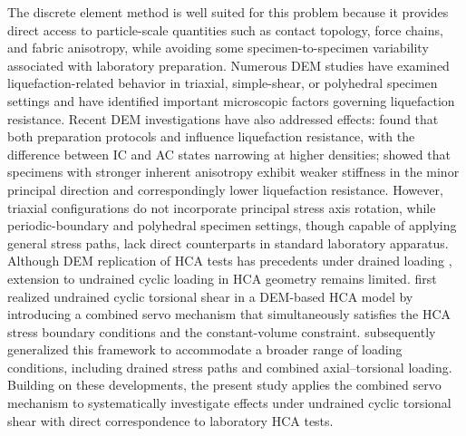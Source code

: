 The discrete element method \citep[DEM;][]{Cundall1979} is well suited for this problem because it provides direct access to particle-scale quantities such as contact topology, force chains, and fabric anisotropy, while avoiding some specimen-to-specimen variability associated with laboratory preparation. Numerous DEM studies have examined liquefaction-related behavior in triaxial, simple-shear, or polyhedral specimen settings \citep[e.g.,][]{Huang2018,Yang2021,Jiang2021,Morimoto2021,WuYang2022,Xie2023,YangHuang2023,Zhang2023} and have identified important microscopic factors governing liquefaction resistance. Recent DEM investigations have also addressed \Kzero{} effects: \citet{YangTaiebat2024} found that both preparation protocols and \Kzero{} influence liquefaction resistance, with the difference between IC and AC states narrowing at higher densities; \citet{Otsubo2022} showed that specimens with stronger inherent anisotropy exhibit weaker stiffness in the minor principal direction and correspondingly lower liquefaction resistance. However, triaxial configurations do not incorporate principal stress axis rotation, while periodic-boundary and polyhedral specimen settings, though capable of applying general stress paths, lack direct counterparts in standard laboratory apparatus. Although DEM replication of HCA tests has precedents under drained loading \citep[e.g.,][]{Li2014,Liu2021}, extension to undrained cyclic loading in HCA geometry remains limited. \citet{Han2024jgs} first realized undrained cyclic torsional shear in a DEM-based HCA model by introducing a combined servo mechanism that simultaneously satisfies the HCA stress boundary conditions and the constant-volume constraint. \citet{Ma2024} subsequently generalized this framework to accommodate a broader range of loading conditions, including drained stress paths and combined axial--torsional loading. Building on these developments, the present study applies the combined servo mechanism to systematically investigate \Kzero{} effects under undrained cyclic torsional shear with direct correspondence to laboratory HCA tests.

